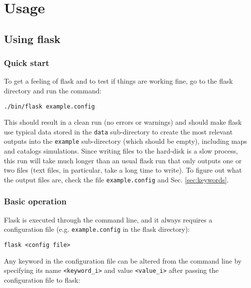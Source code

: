 \documentclass[12pt]{book} %
\begin{document}
\chapter{Usage}
\label{sec:usage}

\section{Using {\sc flask}}
\label{sec:flask}

\subsection{Quick start}
\label{sec:quick-start}

To get a feeling of {\sc flask} and to test if things are working fine, go to the {\sc flask} 
directory and run the command:

\vspace{0.5cm}
\noindent
{\tt ./bin/flask example.config}
\vspace{0.5cm}

\noindent
This should result in a clean run (no errors or warnings) and should make {\sc flask} 
use typical data stored in the {\tt data} sub-directory to create 
the most relevant outputs into the {\tt example} sub-directory (which should be empty), 
including maps and catalogs simulations. Since writing files to the hard-disk is a slow process, 
this run will take much longer than an usual {\sc flask} run that only outputs one or two files 
(text files, in particular, take a long time to write). 
To figure out what the output files are, check the file {\tt example.config} and Sec. 
\ref{sec:keywords}.
 
\subsection{Basic operation}
\label{sec:operation}

{\sc Flask} is executed through the command line, and it always requires a configuration file 
(e.g. {\tt example.config} in the {\sc flask} directory):

\vspace{0.5cm}
\noindent
{\tt flask <config file>}
\vspace{0.5cm}

Any keyword in the configuration file can be altered from the command line by specifying its 
name {\tt<keyword\_i>} and value {\tt<value\_i>} after passing the configuration file to {\sc flask}: 
\end{document}
